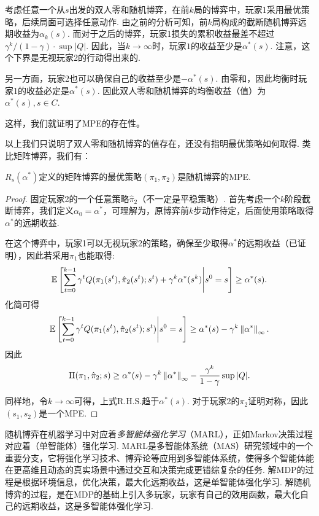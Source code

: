 考虑任意一个从$s$出发的双人零和随机博弈，在前$k$局的博弈中，玩家1采用最优策略，后续局面可选择任意动作. 由之前的分析可知，前$k$局构成的截断随机博弈远期收益为$\alpha_k(s)$. 而对于之后的博弈，玩家1损失的累积收益最差不超过$\gamma^k/(1-\gamma)\cdot \sup|Q|$. 因此，当$k\to\infty$时，玩家$1$的收益至少是$\alpha^*(s)$. 注意，这个下界是无视玩家2的行动得出来的.

另一方面，玩家2也可以确保自己的收益至少是$-\alpha^*(s)$. 由零和，因此均衡时玩家1的收益必定是$\alpha^*(s)$. 因此双人零和随机博弈的均衡收益（值）为$\alpha^*(s),s\in C$.

这样，我们就证明了MPE的存在性。

以上我们只说明了双人零和随机博弈的值存在，还没有指明最优策略如何取得. 类比矩阵博弈，我们有：
\begin{theorem}
$R_s(\alpha^*)$定义的矩阵博弈的最优策略$(\pi_1,\pi_2)$是随机博弈的MPE. 
\end{theorem}
\begin{proof}
固定玩家2的一个任意策略$\hat{\pi}_2$（不一定是平稳策略）. 首先考虑一个$k$阶段截断博弈，我们定义$\alpha_0=\alpha^*$，可理解为，原博弈前$k$步动作待定，后面使用策略取得$\alpha^*$的远期收益.

在这个博弈中，玩家1可以无视玩家2的策略，确保至少取得$\alpha^*$的远期收益（已证明），因此若采用$\pi_1$也能取得:
\[\mathbb{E}\left[\sum_{t=0}^{k-1}\gamma^tQ(\pi_1(s^t),\hat{\pi}_2(s^t);s^t)+\gamma^k\alpha^*(s^k)\middle|s^0=s\right]\ge \alpha^*(s).\]
化简可得
\[\mathbb{E}\left[\sum_{t=0}^{k-1}\gamma^tQ(\pi_1(s^t),\hat{\pi}_2(s^t);s^t)\middle|s^0=s\right]\ge \alpha^*(s)-\gamma^k\left\|\alpha^*\right\|_\infty.\]
因此
\[\Pi(\pi_1,\hat{\pi}_2;s)\ge \alpha^*(s) - \gamma^k\left\|\alpha^*\right\|_\infty - \frac{\gamma^k}{1-\gamma}\sup|Q|.\]

同样地，令$k\to\infty$可得，上式R.H.S.趋于$\alpha^*(s)$. 对于玩家2的$\pi_2$证明对称，因此$(s_1,s_2)$是一个MPE.
\end{proof}

随机博弈在机器学习中对应着\emph{多智能体强化学习}（MARL），正如Markov决策过程对应着（单智能体）强化学习. MARL是多智能体系统（MAS）研究领域中的一个重要分支，它将强化学习技术、博弈论等应用到多智能体系统，使得多个智能体能在更高维且动态的真实场景中通过交互和决策完成更错综复杂的任务. 解MDP的过程是根据环境信息，优化决策，最大化远期收益，这是单智能体强化学习. 解随机博弈的过程，是在MDP的基础上引入多玩家，玩家有自己的效用函数，最大化自己的远期收益，这是多智能体强化学习. 

\endgroup